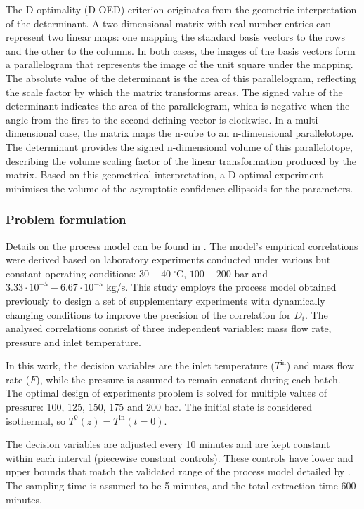 \documentclass[a4paper,fleqn]{cas-dc}
\begin{document}
		The D-optimality (D-OED) criterion originates from the geometric interpretation of the determinant. A two-dimensional matrix with real number entries can represent two linear maps: one mapping the standard basis vectors to the rows and the other to the columns. In both cases, the images of the basis vectors form a parallelogram that represents the image of the unit square under the mapping. The absolute value of the determinant is the area of this parallelogram, reflecting the scale factor by which the matrix transforms areas. The signed value of the determinant indicates the area of the parallelogram, which is negative when the angle from the first to the second defining vector is clockwise. In a multi-dimensional case, the matrix maps the n-cube to an n-dimensional parallelotope. The determinant provides the signed n-dimensional volume of this parallelotope, describing the volume scaling factor of the linear transformation produced by the matrix. Based on this geometrical interpretation, a D-optimal experiment minimises the volume of the asymptotic confidence ellipsoids for the parameters.
		
		\subsubsection{Problem formulation}
		
		Details on the process model can be found in \citet{Sliczniuk2024}. The model's empirical correlations were derived based on laboratory experiments conducted under various but constant operating conditions: $30 - 40~^\circ\text{C}$, $100 - 200$ bar and $3.33 \cdot 10^{-5} - 6.67 \cdot 10^{-5}$ kg/s. This study employs the process model obtained previously to design a set of supplementary experiments with dynamically changing conditions to improve the precision of the correlation for $D_i$. The analysed correlations consist of three independent variables: mass flow rate, pressure and inlet temperature. 
		
		In this work, the decision variables are the inlet temperature ($T^{\text{in}}$) and mass flow rate ($F$), while the pressure is assumed to remain constant during each batch. The optimal design of experiments problem is solved for multiple values of pressure: 100, 125, 150, 175 and 200 bar. The initial state is considered isothermal, so $T^0(z) = T^{\text{in}}(t=0)$.
		
		The decision variables are adjusted every 10 minutes and are kept constant within each interval (piecewise constant controls). These controls have lower and upper bounds that match the validated range of the process model detailed by \citet{Sliczniuk2024}. The sampling time is assumed to be 5 minutes, and the total extraction time 600 minutes.
		
\end{document}
